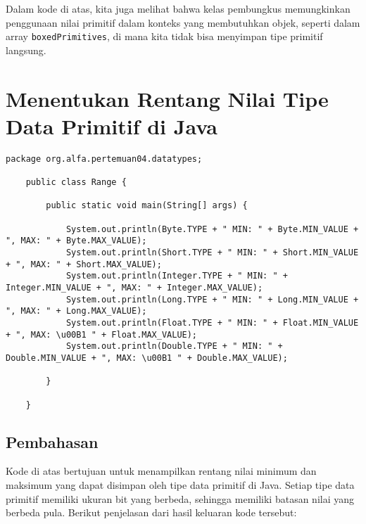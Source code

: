 Dalam kode di atas, kita juga melihat bahwa kelas pembungkus memungkinkan penggunaan nilai primitif dalam konteks yang membutuhkan objek, seperti dalam array \texttt{boxedPrimitives}, di mana kita tidak bisa menyimpan tipe primitif langsung.

\section{Menentukan Rentang Nilai Tipe Data Primitif di Java}

\begin{lstlisting}[style=JavaStyle, caption={Java Code for Displaying Range of Primitive Data Types}]
	package org.alfa.pertemuan04.datatypes;
	
	public class Range {
		
		public static void main(String[] args) {
			
			System.out.println(Byte.TYPE + " MIN: " + Byte.MIN_VALUE + ", MAX: " + Byte.MAX_VALUE);
			System.out.println(Short.TYPE + " MIN: " + Short.MIN_VALUE + ", MAX: " + Short.MAX_VALUE);
			System.out.println(Integer.TYPE + " MIN: " + Integer.MIN_VALUE + ", MAX: " + Integer.MAX_VALUE);
			System.out.println(Long.TYPE + " MIN: " + Long.MIN_VALUE + ", MAX: " + Long.MAX_VALUE);
			System.out.println(Float.TYPE + " MIN: " + Float.MIN_VALUE + ", MAX: \u00B1 " + Float.MAX_VALUE);
			System.out.println(Double.TYPE + " MIN: " + Double.MIN_VALUE + ", MAX: \u00B1 " + Double.MAX_VALUE);
			
		}
		
	}
\end{lstlisting}

\subsection{Pembahasan}
Kode di atas bertujuan untuk menampilkan rentang nilai minimum dan maksimum yang dapat disimpan oleh tipe data primitif di Java. Setiap tipe data primitif memiliki ukuran bit yang berbeda, sehingga memiliki batasan nilai yang berbeda pula. Berikut penjelasan dari hasil keluaran kode tersebut:

